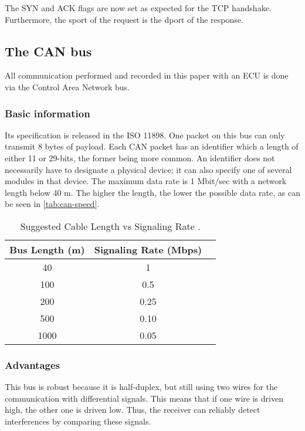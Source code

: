 The SYN and ACK flags are now set as expected for the TCP handshake. Furthermore, the sport of the request is the dport of the response.


\subsection{The CAN bus}

All communication performed and recorded in this paper with an ECU is done via the Control Area Network bus.

\subsubsection{Basic information}

 Its specification is released in the ISO 11898. One packet on this bus can only transmit 8 bytes of payload.
 Each CAN packet has an identifier which a length of either 11 or 29-bits, the former being more common. An identifier does not necessarily have to designate a physical device; it can also specify one of several modules in that device.
 The maximum data rate is 1 Mbit/sec with a network length below 40 m. The higher the length, the lower the possible data rate, as can be seen in \autoref{tab:can-speed}.

\begin{table}[h]
    \centering
    \begin{tabular}{|c|c|c|}
    \hline
    \textbf{Bus Length (m)} & \textbf{Signaling Rate (Mbps)}\\
    \hline
    40 & 1 \\
    \hline
    100 & 0.5 \\
    \hline
    200 & 0.25 \\
    \hline
    500 & 0.10 \\
    \hline
    1000 & 0.05 \\
    \hline
\end{tabular}
\caption{Suggested Cable Length vs Signaling Rate \cite{slla270}.}
\label{tab:can-speed}
\end{table}

\subsubsection{Advantages}

This bus is robust because it is half-duplex, but still using two wires for the communication with differential signals. This means that if one wire is driven high, the other one is driven low. Thus, the receiver can reliably detect interferences by comparing these signals.


